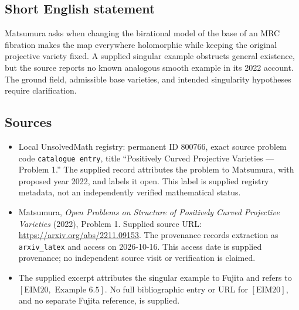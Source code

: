 \documentclass[11pt]{article}
\begin{document}
\subsection{Short English statement}
Matsumura asks when changing the birational model of the base of an MRC fibration makes the map everywhere holomorphic while keeping the original projective variety fixed. A supplied singular example obstructs general existence, but the source reports no known analogous smooth example in its 2022 account. The ground field, admissible base varieties, and intended singularity hypotheses require clarification.
\subsection{Sources}
\begin{itemize}
\item Local UnsolvedMath registry: permanent ID \(800766\), exact source problem code \texttt{catalogue entry}, title ``Positively Curved Projective Varieties --- Problem 1.'' The supplied record attributes the problem to Matsumura, with proposed year 2022, and labels it open. This label is supplied registry metadata, not an independently verified mathematical status.
\item Matsumura, \emph{Open Problems on Structure of Positively Curved Projective Varieties} (2022), Problem 1. Supplied source URL: \url{https://arxiv.org/abs/2211.09153}. The provenance records extraction as \texttt{arxiv\_latex} and access on 2026-10-16. This access date is supplied provenance; no independent source visit or verification is claimed.
\item The supplied excerpt attributes the singular example to Fujita and refers to \([\mathrm{EIM20},\text{ Example }6.5]\). No full bibliographic entry or URL for \([\mathrm{EIM20}]\), and no separate Fujita reference, is supplied.
\end{itemize}
\end{document}
